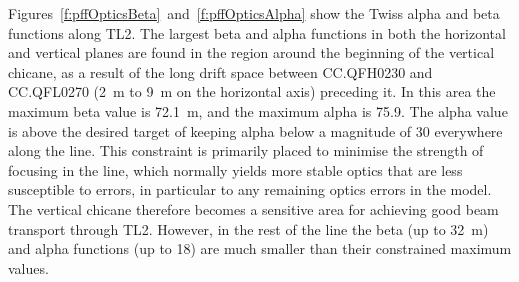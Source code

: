 Figures~\ref{f:pffOpticsBeta}~and~\ref{f:pffOpticsAlpha} show the Twiss alpha and beta functions along TL2. The largest beta and alpha functions in both the horizontal and vertical planes are found in the region around the beginning of the vertical chicane, as a result of the long drift space between CC.QFH0230 and CC.QFL0270 (2~m to 9~m on the horizontal axis) preceding it. In this area the maximum beta value is 72.1~m, and the maximum alpha is 75.9. The alpha value is above the desired target of keeping alpha below a magnitude of 30 everywhere along the line. This constraint is primarily placed to minimise the strength of focusing in the line, which normally yields more stable optics that are less susceptible to errors, in particular to any remaining optics errors in the model. The vertical chicane therefore becomes a sensitive area for achieving good beam transport through TL2. However, in the rest of the line the beta (up to 32~m) and alpha functions (up to 18) are much smaller than their constrained maximum values.

